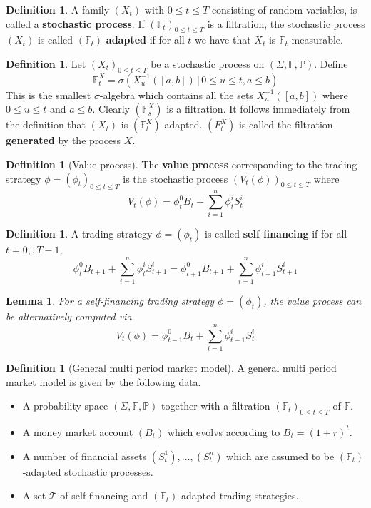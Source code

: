 \documentclass[10pt, oneside, reqno]{amsart}
\theoremstyle{plain}%
\newtheorem{lem}[thm]{Lemma}
\theoremstyle{definition}
\newtheorem{defn}[thm]{Definition}
\theoremstyle{remark}
\newcommand{\given}{ \, | \,}
\newcommand{\F}{\mathbb{F}}
\newcommand{\sumni}{\sum_{i=1}^n}
\begin{document}
\begin{defn}
	A family $(X_t)$ with $0 \leq t \leq T$ consisting of random variables, is called a \textbf{stochastic process}.  If $(\F_t)_{0 \leq t \leq T}$ is a filtration, the stochastic process $(X_t)$ is called $(\F_t)$-\textbf{adapted} if for all $t$ we have that $X_t$ is $\F_t$-measurable.
\end{defn}

\begin{defn}Let $(X_t)_{0 \leq t \leq T}$ be a stochastic process on $(\Sigma, \F, \mathbb{P})$.  Define\[
	\F^X_t = \sigma \left(X^{-1}_u ([a,b]) \given 0 \leq u \leq t, a \leq b \right)
\]
This is the smallest $\sigma$-algebra which contains all the sets $X^{-1}_u([a,b])$ where $0 \leq u \leq t$ and $a \leq b$.  Clearly $(\F^X_s)$ is a filtration.  It follows immediately from the definition that $(X_t)$ is $(\F^X_t)$ adapted.  $(F^X_t)$ is called the filtration \textbf{generated} by the process $X$.
	
\end{defn}


\begin{defn}[Value process]
	The \textbf{value process} corresponding to the trading strategy $\phi = (\phi_t)_{0 \leq t \leq T}$ is the stochastic process $(V_t(\phi))_{0 \leq t \leq T}$ where \[
		V_t(\phi) = \phi^0_t B_t + \sumni \phi^i_t S_t^i
	\]
\end{defn}

\begin{defn}
	A trading strategy $\phi = (\phi_t)$ is called \textbf{self financing} if for all $t = 0,\dot,T-1$,\[
		\phi^0_t B_{t+1} + \sumni \phi^i_t S^i_{t+1} = \phi^0_{t+1} B_{t+1} + \sumni \phi^i_{t+1} S^i_{t+1}
	\]
\end{defn}

\begin{lem}
	For a self-financing trading strategy $\phi = (\phi_t)$, the value process can be alternatively computed via \[
		V_t(\phi) = \phi_{t-1}^0 B_t + \sumni \phi^i_{t-1} S^i_t
	\]
\end{lem}


\begin{defn}[General multi period market model]
		A general multi period market model is given by the following data.
		\begin{itemize}
			\item A probability space $(\Sigma, \F, \mathbb{P})$ together with a filtration $(\F_t)_{0 \leq t \leq T}$ of $\F$.
			\item A money market account $(B_t)$ which evolvs according to $B_t = (1 +r)^t$.
			\item A number of financial assets $(S^1_t), \dots, (S^n_t)$ which are assumed to be $(\F_t)$-adapted stochastic processes.  
			\item A set $\mathcal{T}$ of self financing and $(\F_t)$-adapted trading strategies. 
		\end{itemize}
\end{defn}
\end{document}
